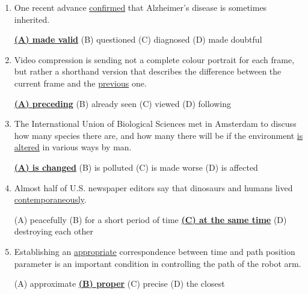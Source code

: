 \documentclass[main.tex]{subfiles}
\begin{document}
\setcounter{section}{100}



\vspace{3mm}

\begin{enumerate}[nosep,leftmargin=*]
	\itemsep10pt
	\item One recent advance \underline{confirmed} that Alzheimer's disease is sometimes inherited.
	
	\underline{\textbf{(A) made valid}} \quad (B) questioned \quad (C) diagnosed \quad (D) made doubtful
	\item Video compression is sending not a complete colour portrait for each frame, but rather a shorthand version that describes the difference between the current frame and the \underline{previous} one.
	
	\underline{\textbf{(A) preceding}} \quad (B) already seen \quad (C) viewed \quad (D) following
	\item The International Union of Biological Sciences met in Amsterdam to discuss how many species there are, and how many there will be if the environment \underline{is altered} in various ways by man.
	
	\underline{\textbf{(A) is changed}} \quad (B) is polluted \quad (C) is made worse \quad (D) is affected
	\item Almost half of U.S. newspaper editors say that dinosaurs and humans lived \underline{contemporaneously}.
	
	(A) peacefully \quad (B) for a short period of time \quad \underline{\textbf{(C) at the same time}} \quad (D) destroying each other
	\item Establishing an \underline{appropriate} correspondence between time and path position parameter is an important condition in controlling the path of the robot arm.
	
	(A) approximate \quad \underline{\textbf{(B) proper}} \quad (C) precise \quad (D) the closest
\end{enumerate}


\vspace{3mm}
\end{document}
